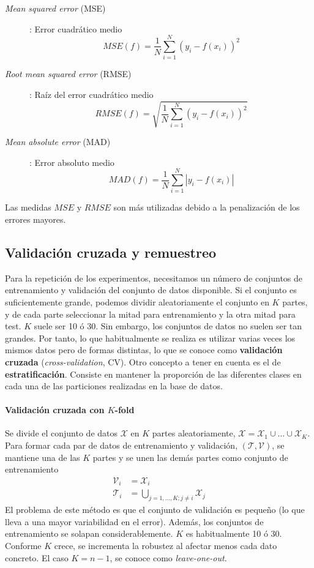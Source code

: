 \begin{description}
	\item[\textit{Mean squared error} (MSE)]: Error 
	cuadrático medio
		\[ MSE(f) = \frac{1}{N} \sum\limits_{i=1}^N
								(y_i - f(x_i))^2	\]
	\item[\textit{Root mean squared error} (RMSE)]: Raíz del 
	error cuadrático medio
		\[ RMSE(f) = \sqrt{\frac{1}{N} 
		\sum\limits_{i=1}^N (y_i - f(x_i))^2}	\]
		
	\item[\textit{Mean absolute error} (MAD) ]: Error 
	absoluto medio
		\[ MAD(f) = \frac{1}{N} \sum\limits_{i=1}^N
								|y_i - f(x_i)|	\]
\end{description}

	Las medidas $MSE$ y $RMSE$ son más utilizadas debido a la 
penalización de los errores mayores. 

\subsection{Validación cruzada y remuestreo}
\label{sssec:CV}
	
	Para la repetición de los experimentos, necesitamos un 
número de conjuntos de entrenamiento y validación del 
conjunto de datos disponible. Si el conjunto es 
suficientemente grande, podemos dividir aleatoriamente el 
conjunto en $K$ partes, y de cada parte seleccionar la mitad 
para entrenamiento y la otra mitad para test. $K$ suele ser 
10 ó 30. Sin embargo, los conjuntos de datos no suelen ser 
tan grandes. Por tanto, lo que habitualmente se realiza es 
utilizar varias veces los mismos datos pero de formas 
distintas, lo que se conoce como \textbf{validación cruzada} 
(\textit{cross-validation}, CV). Otro concepto a tener en 
cuenta es el de \textbf{estratificación}. Consiste en 
mantener la proporción de las diferentes clases en cada una 
de las particiones realizadas en la base de datos. 
	
\paragraph{Validación cruzada con $K$-fold} Se divide el 
conjunto de datos $\mathcal{X}$ en $K$ partes aleatoriamente, 
$\mathcal{X} = \mathcal{X}_1 \cup \dots \cup \mathcal{X}_K$. 
Para formar cada par de datos de entrenamiento y validación, 
$(\mathcal{T}, \mathcal{V})$, se mantiene una de las $K$ 
partes y se unen las demás partes como conjunto de 
entrenamiento
\begin{align*}
	\mathcal{V}_i &= \mathcal{X}_i \\
	\mathcal{T}_i &= \underset{j=1,\dots,K; j\neq i}
							\bigcup \mathcal{X}_j
\end{align*} 
	El problema de este método es que el conjunto de 
validación es pequeño (lo que lleva a una mayor variabilidad 
en el error). Además, los conjuntos de entrenamiento se 
solapan considerablemente. $K$ es habitualmente 10 ó 30. 
Conforme $K$ crece, se incrementa la robustez al afectar 
menos cada dato concreto. El caso $K = n-1$, se conoce como 
\textit{leave-one-out}. 

